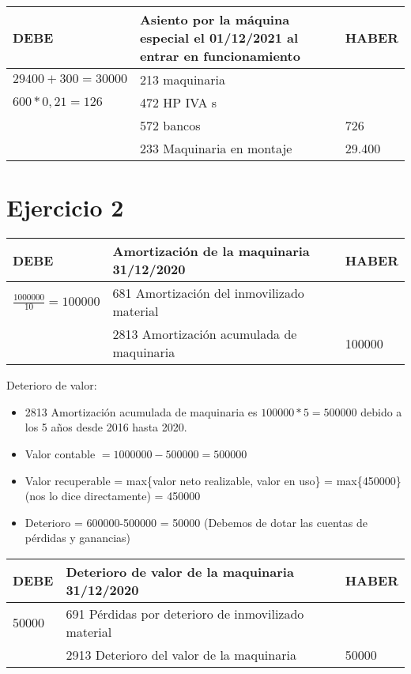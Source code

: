 \documentclass[a4paper,12pt]{article}
\newcommand{\fec}{31/12/}
\newcommand{\AIM}{681 Amortización del inmovilizado material }
\newcommand{\AAMAQ}{2813 Amortización acumulada de maquinaria }
\newcommand{\PDI}{691 Pérdidas por deterioro de inmovilizado material}
\newcommand{\DVM}{2913 Deterioro del valor de la maquinaria }
\begin{document}
\begin{table}[H]
    \centering
    \begin{tabular}{|p{3cm}|p{6cm}|p{3cm}|}
    \hline
    \textbf{DEBE} & \textbf{Asiento por la máquina especial el 01/12/2021 al entrar en funcionamiento} & \textbf{HABER} \\
    \hline
    $29400+300 = 30000$ & 213 maquinaria & \\
    \hline
    $600*0,21 = 126$ & 472 HP IVA s & \\
    \hline
    & 572 bancos & 726 \\
    \hline
    & 233 Maquinaria en montaje & 29.400 \\
    \hline
    \end{tabular}
\end{table}

\section{Ejercicio 2}

\begin{table}[H]
    \centering
    \begin{tabular}{|p{3cm}|p{6cm}|p{3cm}|}
    \hline
    \textbf{DEBE} & \textbf{Amortización de la maquinaria \fec2020} & \textbf{HABER} \\
    \hline
    $\frac{1000000}{10}=100000 $& \AIM & \\
    \hline
    & \AAMAQ & 100000\\
    \hline
    \end{tabular}
\end{table}

Deterioro de valor:
\begin{itemize}
    \item \AAMAQ  es $100000*5=500000$ debido a los 5 años desde 2016 hasta 2020.
    \item Valor contable $= 1000000-500000=500000$
    \item Valor recuperable = max\{valor neto realizable, valor en uso\} = max\{450000\} (nos lo dice directamente) = 450000
    \item Deterioro = 600000-500000 = 50000 (Debemos de dotar las cuentas de pérdidas y ganancias)
\end{itemize}
\begin{table}[H]
    \centering
    \begin{tabular}{|p{3cm}|p{6cm}|p{3cm}|}
    \hline
    \textbf{DEBE} & \textbf{Deterioro de valor de la maquinaria \fec2020} & \textbf{HABER} \\
    \hline
    50000& \PDI & \\
    \hline
    & \DVM & 50000\\
    \hline
    \end{tabular}
\end{table}
\end{document}
